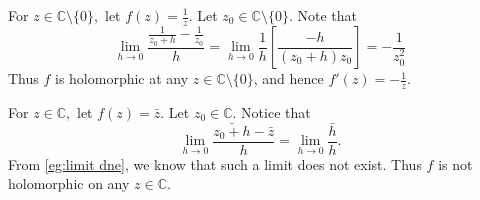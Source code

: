 \documentclass[notoc,notitlepage]{tufte-book}
\begin{document}
\begin{eg}
	For $z \in \mathbb{C} \setminus \{0\},$ let $f(z) = \frac{1}{z}$. Let $z_0 \in \mathbb{C} \setminus \{0\}$. Note that
	\begin{equation*}
		\lim_{h \to 0} \frac{\frac{1}{z_0 + h} - \frac{1}{z_0}}{h} = \lim_{h \to 0} \frac{1}{h} \left[ \frac{-h}{(z_0 + h)z_0} \right] = -\frac{1}{z_0^2} 
	\end{equation*}
	Thus $f$ is holomorphic at any $z \in \mathbb{C} \setminus \{0\}$, and hence $f'(z) = -\frac{1}{z}$.
\end{eg}

\begin{eg}
	For $z \in \mathbb{C},$ let $f(z) = \bar{z}$. Let $z_0 \in \mathbb{C}$. Notice that
	\begin{equation*}
		\lim_{h \to 0} \frac{\bar{z_0 + h} - \bar{z}}{h} = \lim_{h \to 0} \frac{\bar{h}}{h}.
	\end{equation*}
	From \cref{eg:limit dne}, we know that such a limit does not exist. Thus $f$ is not holomorphic on any $z \in \mathbb{C}$.
\end{eg}
\end{document}
